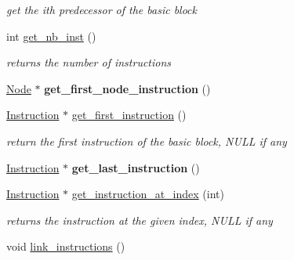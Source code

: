 \begin{DoxyCompactItemize}
\begin{DoxyCompactList}\small\item\em get the ith predecessor of the basic block \end{DoxyCompactList}\item 
\hypertarget{classBasic__block_ad3d770c77ba92d455fa3430df5f16eff}{int \hyperlink{classBasic__block_ad3d770c77ba92d455fa3430df5f16eff}{get\-\_\-nb\-\_\-inst} ()}\label{classBasic__block_ad3d770c77ba92d455fa3430df5f16eff}

\begin{DoxyCompactList}\small\item\em returns the number of instructions \end{DoxyCompactList}\item 
\hypertarget{classBasic__block_afafa2ede7f9146fba4020c7764b8ecca}{\hyperlink{classNode}{\-Node} $\ast$ {\bfseries get\-\_\-first\-\_\-node\-\_\-instruction} ()}\label{classBasic__block_afafa2ede7f9146fba4020c7764b8ecca}

\item 
\hypertarget{classBasic__block_ae6bb481bd9c6352a9f3d7bc5bb2680ac}{\hyperlink{classInstruction}{\-Instruction} $\ast$ \hyperlink{classBasic__block_ae6bb481bd9c6352a9f3d7bc5bb2680ac}{get\-\_\-first\-\_\-instruction} ()}\label{classBasic__block_ae6bb481bd9c6352a9f3d7bc5bb2680ac}

\begin{DoxyCompactList}\small\item\em return the first instruction of the basic block, \-N\-U\-L\-L if any \end{DoxyCompactList}\item 
\hypertarget{classBasic__block_a7083c8485a2378cdfae477a8466eb348}{\hyperlink{classInstruction}{\-Instruction} $\ast$ {\bfseries get\-\_\-last\-\_\-instruction} ()}\label{classBasic__block_a7083c8485a2378cdfae477a8466eb348}

\item 
\hypertarget{classBasic__block_a84aa42e38e2494c2f8ab0a159dba3ca8}{\hyperlink{classInstruction}{\-Instruction} $\ast$ \hyperlink{classBasic__block_a84aa42e38e2494c2f8ab0a159dba3ca8}{get\-\_\-instruction\-\_\-at\-\_\-index} (int)}\label{classBasic__block_a84aa42e38e2494c2f8ab0a159dba3ca8}

\begin{DoxyCompactList}\small\item\em returns the instruction at the given index, \-N\-U\-L\-L if any \end{DoxyCompactList}\item 
\hypertarget{classBasic__block_ae53d18eb1436d162ee9ae565c46b35e5}{void \hyperlink{classBasic__block_ae53d18eb1436d162ee9ae565c46b35e5}{link\-\_\-instructions} ()}\label{classBasic__block_ae53d18eb1436d162ee9ae565c46b35e5}


\end{DoxyCompactItemize}
